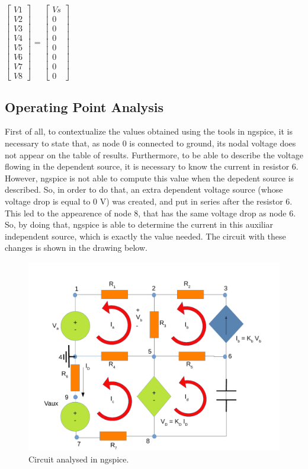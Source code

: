 $\begin{bmatrix}
V1 \\ V2 \\ V3 \\ V4 \\ V5 \\ V6 \\ V7 \\ V8
\end{bmatrix}$
=
$\begin{bmatrix}
Vs \\ 0 \\ 0 \\ 0 \\ 0 \\ 0 \\ 0 \\ 0
\end{bmatrix}
$




\subsection{Operating Point Analysis}
First of all, to contextualize the values obtained using the tools in ngspice, it is necessary to state that, as node 0 is connected to ground, its nodal voltage does not appear on the table of results. Furthermore, to be able to describe the voltage flowing in the dependent source, it is necessary to know the current in resistor 6. However, ngspice is not able to compute this value when the depedent source is described. So, in order to do that, an extra dependent voltage source (whose voltage drop is equal to 0 V) was created, and put in series after the resistor 6. This led to the appearence of node 8, that has the same voltage drop as node 6. So, by doing that, ngspice is able to determine the current in this auxiliar independent source, which is exactly the value needed.
 The circuit with these changes is shown in the drawing below.

\begin{figure}[ht] \centering
\includegraphics[width=0.8\linewidth]{sim1draw.pdf}
\caption{Circuit analysed in ngspice.}
\label{simdraw}
\end{figure}


